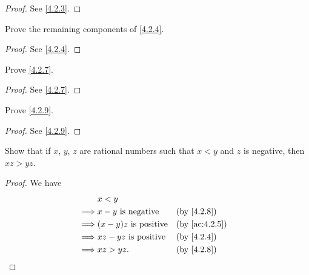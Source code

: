 \begin{proof}
  See \cref{4.2.3}.
\end{proof}

\begin{ex}\label{ex:4.2.3}
  Prove the remaining components of \cref{4.2.4}.
\end{ex}

\begin{proof}
  See \cref{4.2.4}.
\end{proof}

\begin{ex}\label{ex:4.2.4}
  Prove \cref{4.2.7}.
\end{ex}

\begin{proof}
  See \cref{4.2.7}.
\end{proof}

\begin{ex}\label{ex:4.2.5}
  Prove \cref{4.2.9}.
\end{ex}

\begin{proof}
  See \cref{4.2.9}.
\end{proof}

\begin{ex}\label{ex:4.2.6}
  Show that if \(x\), \(y\), \(z\) are rational numbers such that \(x < y\) and \(z\) is negative, then \(xz > yz\).
\end{ex}

\begin{proof}
  We have
  \begin{align*}
             & x < y                                           \\
    \implies & x - y \text{ is negative}    &  & \by{4.2.8}    \\
    \implies & (x - y)z \text{ is positive} &  & \by{ac:4.2.5} \\
    \implies & xz - yz \text{ is positive}  &  & \by{4.2.4}    \\
    \implies & xz > yz.                     &  & \by{4.2.8}
  \end{align*}
\end{proof}